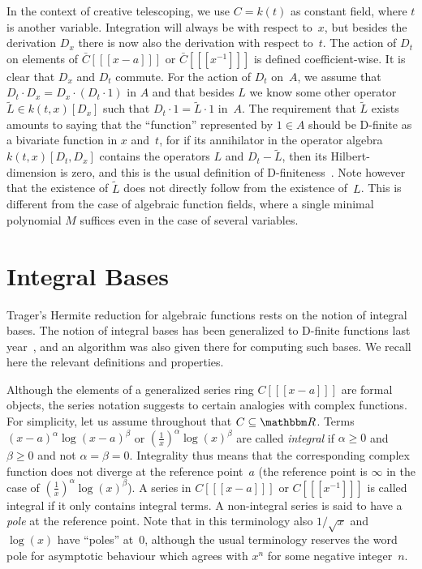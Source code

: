\documentclass{sig-alternate}
\let\set\mathbbm
\begin{document}
In the context of creative telescoping, we use $C=k(t)$ as constant field, where
$t$ is another variable. Integration will always be with respect to~$x$, but
besides the derivation $D_x$ there is now also the derivation with respect
to~$t$. The action of $D_t$ on elements of $\bar C[[[x-a]]]$ or $\bar
C[[[x^{-1}]]]$ is defined coefficient-wise. It is clear that $D_x$ and $D_t$
commute. For the action of $D_t$ on~$A$, we assume that $D_t\cdot D_x = D_x\cdot
(D_t\cdot 1)$ in $A$ and that besides $L$ we know some other operator $\tilde
L\in k(t,x)[D_x]$ such that $D_t\cdot 1=\tilde L\cdot 1$ in~$A$. The requirement
that $\tilde L$ exists amounts to saying that the ``function'' represented by
$1\in A$ should be D-finite as a bivariate function in $x$ and~$t$, for if its
annihilator in the operator algebra $k(t,x)[D_t,D_x]$ contains the operators $L$
and $D_t-\tilde L$, then its Hilbert-dimension is zero, and this is the usual
definition of D-finiteness~\cite{..,..}.  Note however that the existence of
$\tilde L$ does not directly follow from the existence of~$L$. This is different
from the case of algebraic function fields, where a single minimal polynomial $M$
suffices even in the case of several variables.

\section{Integral Bases}

Trager's Hermite reduction for algebraic functions rests on the notion of
integral bases. The notion of integral bases has been generalized to D-finite
functions last year~\cite{..}, and an algorithm was also given there for
computing such bases. We recall here the relevant definitions and properties.

Although the elements of a generalized series ring $C[[[x-a]]]$ are formal
objects, the series notation suggests to certain analogies with complex
functions.  For simplicity, let us assume throughout that $C\subseteq\set
R$. Terms $(x-a)^\alpha\log(x-a)^\beta$ or $(\tfrac1x)^\alpha\log(x)^\beta$ are
called \emph{integral} if $\alpha\geq0$ and $\beta\geq0$ and not
$\alpha=\beta=0$.  Integrality thus means that the corresponding complex
function does not diverge at the reference point~$a$ (the reference point is
$\infty$ in the case of $(\tfrac1x)^\alpha\log(x)^\beta$). A series in
$C[[[x-a]]]$ or $C[[[x^{-1}]]]$ is called integral if it only contains integral
terms. A non-integral series is said to have a \emph{pole} at the reference
point.  Note that in this terminology also $1/\sqrt{x}$ and $\log(x)$ have
``poles'' at~$0$, although the usual terminology reserves the word pole for
asymptotic behaviour which agrees with $x^n$ for some negative integer~$n$.
\end{document}
